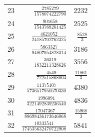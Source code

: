 \begin{longtable}{rrr}
23 & $\frac{2785279}{1578074222790}$ & $2232$\\
24 & $\frac{901658}{1543768261425}$ & $2525$\\
25 & $\frac{4621052}{24185702762325}$ & $\frac{8528}{3}$\\
26 & $\frac{5863327}{94807954828314}$ & $3186$\\
27 & $\frac{36319}{1832211328626}$ & $3556$\\
28 & $\frac{4549}{722515868004}$ & $\frac{11861}{3}$\\
29 & $\frac{11375107}{5736517950570330}$ & $4380$\\
30 & $\frac{1996091}{3221492839236540}$ & $4836$\\
31 & $\frac{17047367}{88698436173646068}$ & $\frac{15968}{3}$\\
32 & $\frac{10333541}{174535632470722908}$ & $5841$\\
\end{longtable}
\endgroup

